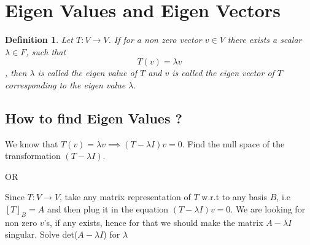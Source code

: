 \documentclass[a4paper, titlepage]{article}
\newtheorem{definition}{Definition}[section]
\begin{document}
\section{Eigen Values and Eigen Vectors}
    \begin{definition}
        Let $T: V \to V$. If for a non zero vector $v \in V$ there
        exists a scalar $\lambda \in F$, such that \[ T(v) = \lambda v \],
        then $\lambda$ is called the eigen value of $T$ and $v$ is
        called the eigen vector of $T$ corresponding to the eigen value
        $\lambda$.
    \end{definition}
    \subsection{How to find Eigen Values ?}
        We know that $T(v) = \lambda v \implies (T-\lambda I)v = 0$.
        Find the null space of the transformation $(T-\lambda I)$. 
        
        OR
        
        Since $T: V \to V$, take any matrix representation of $T$
        w.r.t to any basis $B$, i.e $[T]_B = A$ and then plug it in
        the equation $(T-\lambda I)v = 0$. We are looking for non
        zero $v$'s, if any exists, hence for that we should make the
        matrix $A - \lambda I$ singular. Solve det($A - \lambda I$)
        for $\lambda$
\end{document}
